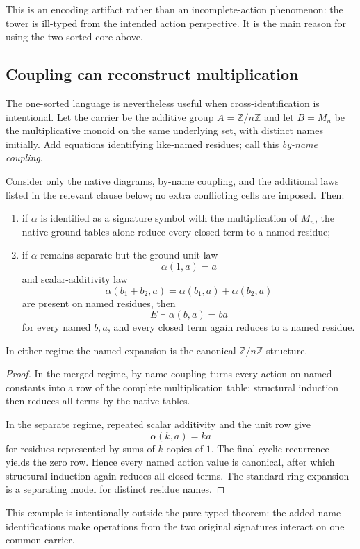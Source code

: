 This is an encoding artifact rather than an incomplete-action phenomenon: the tower is ill-typed from the intended action perspective.  It is the main reason for using the two-sorted core above.

\subsection{Coupling can reconstruct multiplication}

The one-sorted language is nevertheless useful when cross-identification is intentional.  Let the carrier be the additive group $A=\mathbb Z/n\mathbb Z$ and let $B=M_n$ be the multiplicative monoid on the same underlying set, with distinct names initially.  Add equations identifying like-named residues; call this \emph{by-name coupling}.

\begin{proposition}\label{prop:reconstruction}
Consider only the native diagrams, by-name coupling, and the additional
laws listed in the relevant clause below; no extra conflicting cells are
imposed. Then:
\begin{enumerate}[label=(\roman*)]
\item if $\alpha$ is identified as a signature symbol with the multiplication of $M_n$, the native ground tables alone reduce every closed term to a named residue;
\item if $\alpha$ remains separate but the ground unit law
\[
\alpha(1,a)=a
\]
and scalar-additivity law
\[
\alpha(b_1+b_2,a)
=
\alpha(b_1,a)+\alpha(b_2,a)
\]
are present on named residues, then
\[
E\vdash\alpha(b,a)=ba
\]
for every named $b,a$, and every closed term again reduces to a named residue.
\end{enumerate}
In either regime the named expansion is the canonical $\mathbb Z/n\mathbb Z$ structure.
\end{proposition}

\begin{proof}
In the merged regime, by-name coupling turns every action on named constants into a row of the complete multiplication table; structural induction then reduces all terms by the native tables.

In the separate regime, repeated scalar additivity and the unit row give
\[
\alpha(k,a)=ka
\]
for residues represented by sums of $k$ copies of $1$.  The final cyclic recurrence yields the zero row.  Hence every named action value is canonical, after which structural induction again reduces all closed terms.  The standard ring expansion is a separating model for distinct residue names.
\end{proof}

This example is intentionally outside the pure typed theorem: the added name identifications make operations from the two original signatures interact on one common carrier.

